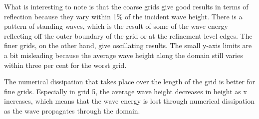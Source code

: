 



What is interesting to note is that the coarse grids give good results in terms of reflection because they vary within 1\% of the incident wave height. There is a pattern of standing waves, which is the result of some of the wave energy reflecting off the outer boundary of the grid or at the refinement level edges. The finer grids, on the other hand, give oscillating results. The small y-axis limits are a bit misleading because the average wave height along the domain still varies within three per cent for the worst grid. 

The numerical dissipation that takes place over the length of the grid is better for fine grids. Especially in grid 5, the average wave height decreases in height as x increases, which means that the wave energy is lost through numerical dissipation as the wave propagates through the domain. 



